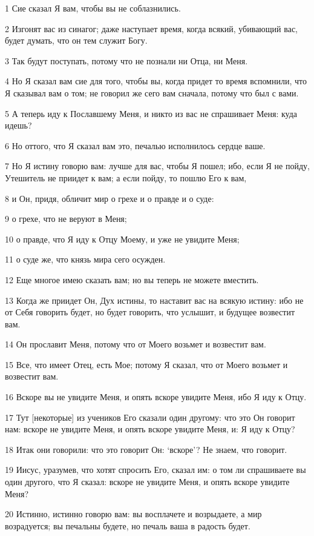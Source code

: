 \par 1 Сие сказал Я вам, чтобы вы не соблазнились.
\par 2 Изгонят вас из синагог; даже наступает время, когда всякий, убивающий вас, будет думать, что он тем служит Богу.
\par 3 Так будут поступать, потому что не познали ни Отца, ни Меня.
\par 4 Но Я сказал вам сие для того, чтобы вы, когда придет то время вспомнили, что Я сказывал вам о том; не говорил же сего вам сначала, потому что был с вами.
\par 5 А теперь иду к Пославшему Меня, и никто из вас не спрашивает Меня: куда идешь?
\par 6 Но оттого, что Я сказал вам это, печалью исполнилось сердце ваше.
\par 7 Но Я истину говорю вам: лучше для вас, чтобы Я пошел; ибо, если Я не пойду, Утешитель не приидет к вам; а если пойду, то пошлю Его к вам,
\par 8 и Он, придя, обличит мир о грехе и о правде и о суде:
\par 9 о грехе, что не веруют в Меня;
\par 10 о правде, что Я иду к Отцу Моему, и уже не увидите Меня;
\par 11 о суде же, что князь мира сего осужден.
\par 12 Еще многое имею сказать вам; но вы теперь не можете вместить.
\par 13 Когда же приидет Он, Дух истины, то наставит вас на всякую истину: ибо не от Себя говорить будет, но будет говорить, что услышит, и будущее возвестит вам.
\par 14 Он прославит Меня, потому что от Моего возьмет и возвестит вам.
\par 15 Все, что имеет Отец, есть Мое; потому Я сказал, что от Моего возьмет и возвестит вам.
\par 16 Вскоре вы не увидите Меня, и опять вскоре увидите Меня, ибо Я иду к Отцу.
\par 17 Тут [некоторые] из учеников Его сказали один другому: что это Он говорит нам: вскоре не увидите Меня, и опять вскоре увидите Меня, и: Я иду к Отцу?
\par 18 Итак они говорили: что это говорит Он: `вскоре'? Не знаем, что говорит.
\par 19 Иисус, уразумев, что хотят спросить Его, сказал им: о том ли спрашиваете вы один другого, что Я сказал: вскоре не увидите Меня, и опять вскоре увидите Меня?
\par 20 Истинно, истинно говорю вам: вы восплачете и возрыдаете, а мир возрадуется; вы печальны будете, но печаль ваша в радость будет.
